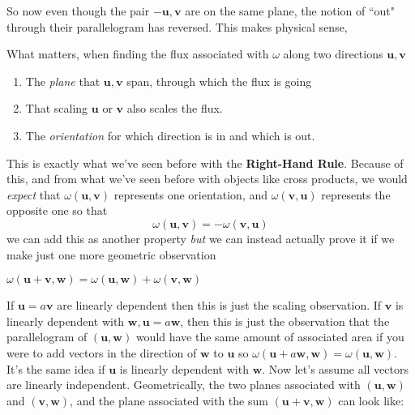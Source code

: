 	So now even though the pair $-\mathbf u, \mathbf v$ are on the same plane, the notion of ``out" through their parallelogram has reversed. This makes physical sense, 
	\begin{concept}
		What matters, when finding the flux associated with $\omega$ along two directions $\mathbf u, \mathbf v$
		\begin{enumerate}
			\item The \emph{plane} that $\mathbf u, \mathbf v$ span, through which the flux is going
			\item That scaling $\mathbf u$ or $\mathbf v$ also scales the flux.
			\item The \emph{orientation} for which direction is in and which is out.
		\end{enumerate}
	\end{concept}
	This is exactly what we've seen before with the \textbf{Right-Hand Rule}. Because of this, and from what we've seen before with objects like cross products, we would \emph{expect} that $\omega(\mathbf u, \mathbf v)$ represents one orientation, and $\omega(\mathbf v, \mathbf u)$ represents the opposite one so that 
	 \begin{equation*}
	 	\omega(\mathbf u, \mathbf v) = -\omega(\mathbf v, \mathbf u)
	 \end{equation*}
	we can add this as another property \emph{but} we can instead actually prove it if we make just one more geometric observation
	\begin{obs}
		$\omega(\mathbf u+\mathbf v, \mathbf w) = \omega(\mathbf u, \mathbf w) + \omega(\mathbf v, \mathbf w)$
	\end{obs}
	If $\mathbf u = a \mathbf v$ are linearly dependent then this is just the scaling observation. If $\mathbf v$ is linearly dependent with $\mathbf w, \mathbf u = a \mathbf w$, then this is just the observation that the parallelogram of $(\mathbf u, \mathbf w)$ would have the same amount of associated area if you were to add vectors in the direction of $\mathbf w$ to $\mathbf u$ so $\omega(\mathbf u + a \mathbf w, \mathbf w) = \omega(\mathbf u, \mathbf w)$. It's the same idea if $\mathbf u$ is linearly dependent with $\mathbf w$. Now let's assume all vectors are linearly independent. Geometrically, the two planes associated with $(\mathbf u,\mathbf w)$ and $(\mathbf v,\mathbf w)$, and the plane associated with the sum $(\mathbf u + \mathbf v, \mathbf w)$ can look like:
	

